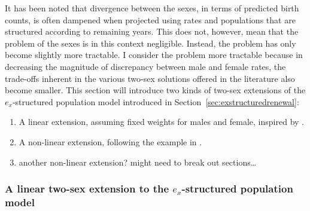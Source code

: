 
It has been noted that divergence between the sexes, in terms of predicted birth
counts, is often dampened when projected using rates and populations that are
structured according to remaining years. This does not, however, mean that the
problem of the sexes is in this context negligible. Instead, the problem has
only become slightly more tractable. I consider the problem more tractable
because in decreasing the magnitude of discrepancy between male and female
rates, the trade-offs inherent in the various two-sex solutions offered in the
literature also become smaller. This section will introduce two kinds of two-sex
extensions of the $e_x$-structured population model introduced in
Section~\ref{sec:exstructuredrenewal}:
\begin{enumerate}
  \item A linear extension, assuming fixed weights for males and female,
  inspired by \citet{goodman1967age}. 
  \item A non-linear extension, following the example in
  \citet{gupta1978alternative}.
  \item another non-linear extension? might need to break out sections\ldots
\end{enumerate}

\subsubsection{A linear two-sex extension to the $e_x$-structured population
model} 

